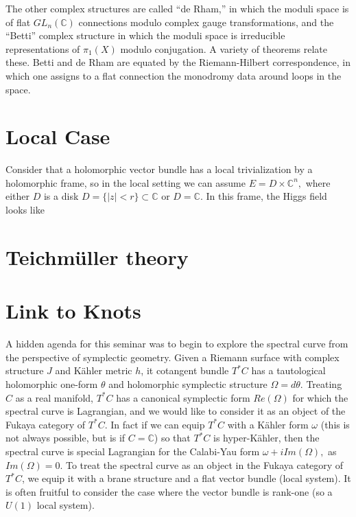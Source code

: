 The other complex structures are called ``de Rham,'' in which the moduli space is of flat
$GL_n(\mathbb C)$ connections modulo complex gauge transformations, and the ``Betti'' complex
structure in which the moduli space is irreducible representations of $\pi_1(X)$ modulo conjugation.
A variety of theorems relate these.  Betti and de Rham are equated by the Riemann-Hilbert
correspondence, in which one assigns to a flat connection the monodromy data around loops in the space.

\section{Local Case}

Consider that a holomorphic vector bundle has a local trivialization by a holomorphic frame,
so in the local setting we can assume $E = D\times \mathbb C^n,$ where either
$D$ is a disk $D = \{|z|<r\}\subset \mathbb C$ or $D = \mathbb C.$  In this frame, the
Higgs field looks like 

\section{Teichm\"uller theory}

\section{Link to Knots}

A hidden agenda for this seminar was to begin to explore the spectral curve from the perspective
of symplectic geometry.  Given a Riemann surface with complex structure $J$ and K\"ahler metric $h$,
it cotangent bundle $T^*C$ has a tautological holomorphic one-form $\theta$ and
holomorphic symplectic structure $\Omega = d\theta$.  
Treating $C$ as a real manifold, $T^*C$ has a canonical symplectic form $Re(\Omega)$
for which the spectral curve is Lagrangian, and we would like to consider it as an
object of the Fukaya category of $T^*C.$  In fact if we can equip $T^*C$ with a K\"ahler
form $\omega$ (this is not always possible, but is if $C = \mathbb C$) so that $T^*C$
is hyper-K\"ahler, then the spectral curve is special Lagrangian for the Calabi-Yau
form $\omega + i Im(\Omega),$ as $Im(\Omega)=0.$
To treat the spectral curve as an object in the Fukaya category of $T^*C$,
we equip it with a brane
structure and a flat vector bundle (local system).  It is often fruitful to consider
the case where the vector bundle is rank-one (so a $U(1)$ local system).

